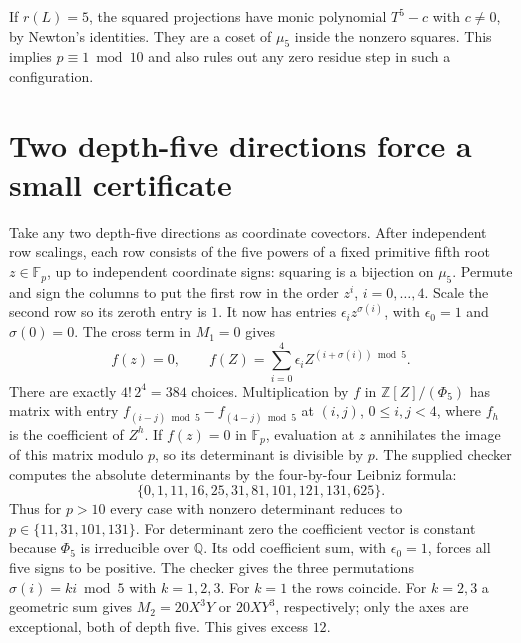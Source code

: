 \documentclass[11pt]{article}
\newcommand{\F}{\mathbb F}
\begin{document}
If $r(L)=5$, the squared projections have monic polynomial $T^5-c$
with $c\ne0$, by Newton's identities. They are a coset of $\mu_5$
inside the nonzero squares. This implies $p\equiv1\bmod 10$ and also
rules out any zero residue step in such a configuration.
\section{Two depth-five directions force a small certificate}
Take any two depth-five directions as coordinate covectors. After
independent row scalings, each row consists of the five powers of a
fixed primitive fifth root $z\in\F_p$, up to independent coordinate
signs: squaring is a bijection on $\mu_5$.
Permute and sign the columns to put the first row in the order $z^i$,
$i=0,\ldots,4$. Scale the second row so its zeroth entry is $1$.
It now has entries $\epsilon_i z^{\sigma(i)}$, with
$\epsilon_0=1$ and $\sigma(0)=0$. The cross term in $M_1=0$ gives
\[
 f(z)=0,\qquad f(Z)=\sum_{i=0}^4\epsilon_i Z^{(i+\sigma(i))\bmod 5}.
\]
There are exactly $4!\,2^4=384$ choices. Multiplication by $f$ in
$\mathbb Z[Z]/(\Phi_5)$ has matrix with entry
$f_{(i-j)\bmod 5}-f_{(4-j)\bmod 5}$ at $(i,j)$, $0\le i,j<4$,
where $f_h$ is the coefficient of $Z^h$. If $f(z)=0$ in $\F_p$,
evaluation at $z$ annihilates the image of this matrix modulo $p$,
so its determinant is divisible by $p$. The supplied checker computes
the absolute determinants by the four-by-four Leibniz formula:
\[
 \{0,1,11,16,25,31,81,101,121,131,625\}.
\]
Thus for $p>10$ every case with nonzero determinant reduces to
$p\in\{11,31,101,131\}$.
For determinant zero the coefficient vector is constant because
$\Phi_5$ is irreducible over $\mathbb Q$. Its odd coefficient sum,
with $\epsilon_0=1$, forces all five signs to be positive.
The checker gives the three permutations $\sigma(i)=ki\bmod5$
with $k=1,2,3$. For $k=1$ the rows coincide. For $k=2,3$ a geometric
sum gives $M_2=20X^3Y$ or $20XY^3$, respectively; only the axes
are exceptional, both of depth five. This gives excess $12$.
\end{document}
